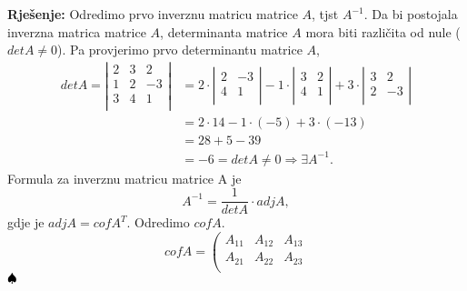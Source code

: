 \documentclass{article}
\newenvironment{solution}{\noindent\textbf{Rje\v senje:\newline}}{$\hfill\spadesuit$}
\begin{document}
\begin{solution}
    Odredimo prvo inverznu matricu matrice $A$, tjst $A^{-1}$.
    Da bi postojala inverzna matrica matrice $A$, determinanta matrice $A$ mora biti razli\v cita od nule ($detA\neq 0$).
    Pa provjerimo prvo determinantu matrice $A$,
    \newline
    \begin{equation*}
        \begin{aligned}
            detA=\left|
            \begin{array}{ccc}
                2 & 3 & 2 \\
                1 & 2 & -3 \\
                3 & 4 & 1 \\
            \end{array}
            \right|
            &=2\cdot \left|
            \begin{array}{cc}
                2 & -3 \\
                4 & 1 \\
            \end{array}
            \right| -
            1\cdot \left|
            \begin{array}{cc}
                3 & 2 \\
                4 & 1 \\
            \end{array}
            \right| +
            3\cdot \left|
            \begin{array}{cc}
                3 & 2 \\
                2 & -3 \\
            \end{array}
            \right|\\
            &=2\cdot 14 -1\cdot (-5)+3\cdot (-13)\\
            &=28+5-39\\
            &=-6=detA\neq 0\Rightarrow\exists A^{-1}.
        \end{aligned}
    \end{equation*}
    Formula za inverznu matricu matrice A je
    $$A^{-1}=\frac{1}{detA}\cdot adjA,$$
    gdje je $adjA=cofA^T$. Odredimo $cofA$.
    \begin{equation*}
        cofA=\left(
        \begin{array}{ccc}
            A_{11} & A_{12} & A_{13} \\
            A_{21} & A_{22} & A_{23} \\

\end{array}
\end{equation*}
\end{solution}
\end{document}
